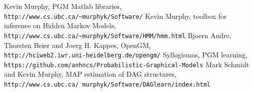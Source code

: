 \documentclass{article}
\begin{document}
    \newpage
    \begin{thebibliography}{5}
        Kevin Murphy, PGM Matlab libraries, \\\texttt{http://www.cs.ubc.ca/\~{}murphyk/Software/}
        Kevin Murphy, toolbox for inference on Hidden Markov Models, \\\texttt{http://www.cs.ubc.ca/\~{}murphyk/Software/HMM/hmm.html}
        Bjoern Andre, Thorsten Beier and Joerg H. Kappes, OpenGM, \\\texttt{http://hciweb2.iwr.uni-heidelberg.de/opengm/}
        Syllogismos, PGM learning, \\\texttt{https://github.com/anhncs/Probabilistic-Graphical-Models}
        Mark Schmidt and Kevin Murphy, MAP estimation  of DAG structures, \\\texttt{http://www.cs.ubc.ca/~murphyk/Software/DAGlearn/index.html}
    \end{thebibliography}
\end{document}

